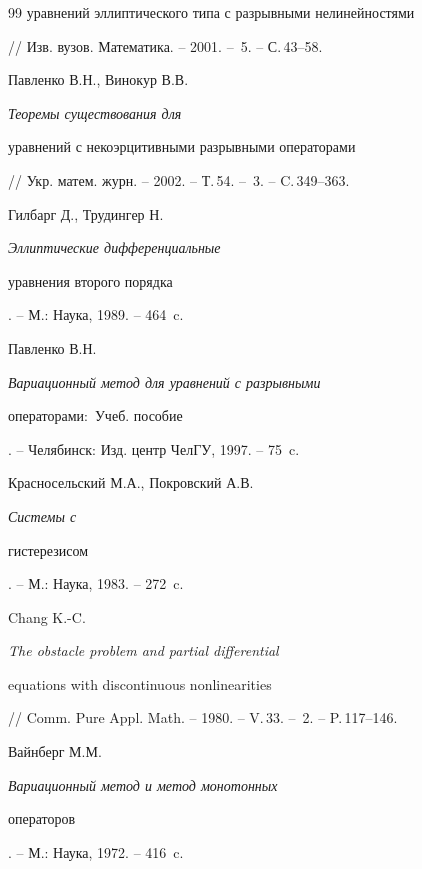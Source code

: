 \begin{thebibliography}{99}
{уравнений эллиптического типа с разрывными нелинейностями}


// Изв. вузов. Математика. -- 2001. -- \No\,5. -- С.\,43--58.




Павленко В.Н., Винокур В.В. {\em Теоремы существования для


уравнений с некоэрцитивными разрывными операторами}


// Укр. матем. журн. -- 2002. -- Т.\,54. -- \No\,3. -- C.\,349--363.




Гилбарг Д., Трудингер Н. {\em Эллиптические дифференциальные


уравнения второго порядка}. -- М.: Наука, 1989. -- 464~c.




Павленко В.Н. {\em Вариационный метод для уравнений с разрывными


операторами$:$ Учеб. пособие}. -- Челябинск: Изд. центр ЧелГУ, 1997. -- 75~c.




Красносельский М.А., Покровский А.В. {\em Системы с


гистерезисом}. -- М.: Наука, 1983. -- 272~c.




Chang K.-C. {\em The obstacle problem and partial differential


equations with discontinuous nonlinearities}


// Comm. Pure Appl. Math. -- 1980. -- V.\,33. -- \No\,2. -- P.\,117--146.




Вайнберг М.М. {\em Вариационный метод и метод монотонных


операторов}. -- М.: Наука, 1972. -- 416~c.





\end{thebibliography}





\vskip 2cm












\label{end}








